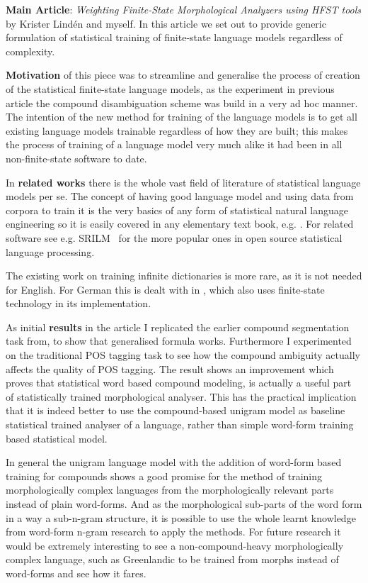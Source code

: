 \documentclass[officiallayout]{unihelcompling}
\begin{document}
\textbf{Main Article}: \emph{Weighting Finite-State Morphological Analyzers
using HFST tools} by Krister Lindén and myself. In this article we set out
to provide generic formulation of statistical training of finite-state
language models regardless of complexity.

\textbf{Motivation} of this piece was to streamline and generalise the process
of creation of the statistical finite-state language models, as the experiment
in previous article  the compound
disambiguation scheme was build in a very ad hoc manner. The intention of the
new method for training of the language models is to get all existing language
models trainable regardless of how they are built; this makes the process of
training of a language model very much alike it had been in all
non-finite-state software to date.

In \textbf{related works} there is the whole vast field of literature of
statistical language models per se. The concept of having good language model
and using data from corpora to train it is the very basics of any form of
statistical natural language engineering so it is easily covered in any
elementary text book, e.g. \citet{manning1999foundations}. For related software
see e.g.  SRILM~\citep{stolcke2002srilm} for the more popular ones in open
source statistical language processing.

The existing work on training infinite dictionaries is more rare, as it is not
needed for English. For German this is dealt with in
\citep{schiller2006german}, which also uses finite-state technology in its
implementation.

As initial \textbf{results} in the article I replicated the earlier compound
segmentation task from, to show that generalised formula works.
Furthermore I experimented on the traditional POS tagging task to see how the
compound ambiguity actually affects the quality of POS tagging. The result
shows an improvement which proves that statistical word based compound
modeling, is actually a useful part of statistically trained morphological
analyser. This has the practical implication that it is indeed better to
use the compound-based unigram model as baseline statistical trained analyser
of a language, rather than simple word-form training based statistical model.

In general the unigram language model with the addition of word-form based
training for compounds shows a good promise for the method of training
morphologically complex languages from the morphologically relevant parts
instead of plain word-forms. And as the morphological sub-parts of the word
form in a way a sub-n-gram structure, it is possible to use the whole learnt
knowledge from word-form n-gram research to apply the methods. For future
research it would be extremely interesting to see a non-compound-heavy
morphologically complex language, such as Greenlandic to be trained from morphs
instead of word-forms and see how it fares.
\end{document}
